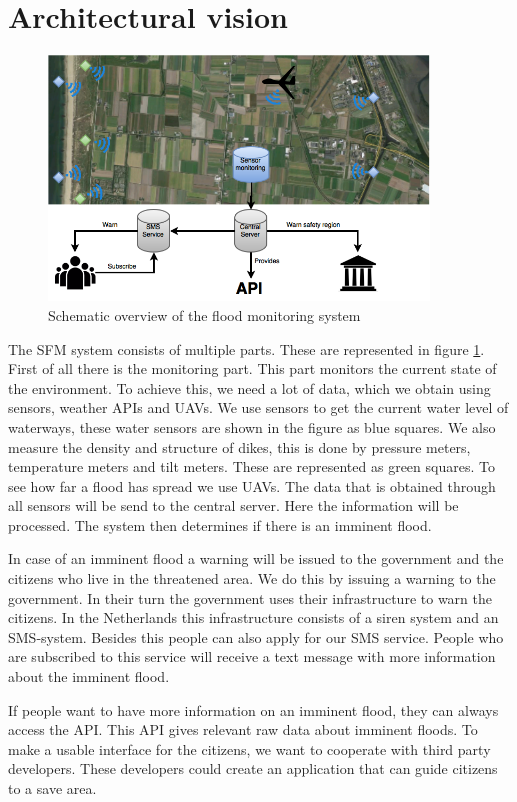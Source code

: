 \section{Architectural vision}
\begin{figure}[hb!]
\includegraphics[keepaspectratio=true,width=0.9\textwidth]{images/archVision.png}
\caption{Schematic overview of the flood monitoring system}
\label{fig:architectural-vision}
\end{figure}

The SFM system consists of multiple parts. These are represented in figure \ref{fig:architectural-vision}. First of all there is the monitoring part. This part monitors the current state of the environment. To achieve this, we need a lot of data, which we obtain using sensors, weather APIs and UAVs. We use sensors to get the current water level of waterways, these water sensors are shown in the figure as blue squares. We also measure the density and structure of dikes, this is done by pressure meters, temperature meters and tilt meters. These are represented as green squares. To see how far a flood has spread we use UAVs. The data that is obtained through all sensors will be send to the central server. Here the information will be processed. The system then determines if there is an imminent flood.

In case of an imminent flood a warning will be issued to the government and the citizens who live in the threatened area. We do this by issuing a warning to the government. In their turn the government uses their infrastructure to warn the citizens. In the Netherlands this infrastructure consists of a siren system and an SMS-system. Besides this people can also apply for our SMS service. People who are subscribed to this service will receive a text message with more information about the imminent flood. 

If people want to have more information on an imminent flood, they can always access the API. This API gives relevant raw data about imminent floods. To make a usable interface for the citizens, we want to cooperate with third party developers. These developers could create an application that can guide citizens to a save area.
